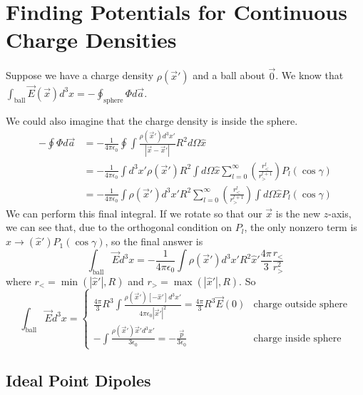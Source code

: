 \documentclass[a4paper,twoside,master.tex]{subfiles}
\begin{document}
\section{Finding Potentials for Continuous Charge Densities}%
\label{sec:finding_potentials_for_continuous_charge_densities}

Suppose we have a charge density $\rho(\vec{x}')$ and a ball about $\vec{0}$. We know that $\int_{\text{ball}}\vec{E}(\vec{x})d^3x = -\oint_{\text{sphere}}\Phi d\vec{a}$.

We could also imagine that the charge density is inside the sphere.
\begin{align}
    -\oint\Phi d\vec{a} &= -\frac{1}{4\pi\epsilon_0}\oint\int \frac{\rho(\vec{x}')d^3x'}{|\vec{x}-\vec{x}'|}R^2 d\Omega \hat{x}\\
    &= -\frac{1}{4\pi\epsilon_0}\int d^3x'\rho(\vec{x}')R^2\int d\Omega \hat{x}\sum_{l=0}^{\infty}\left(\frac{r^l_<}{r^{l+1}_>} \right)P_l(\cos\gamma)\\
    &= -\frac{1}{4\pi\epsilon_0}\int\rho(\vec{x}')d^3x' R^2 \sum_{l=0}^{\infty} \left( \frac{r^l_<}{r^{l+1}_>} \right)\int d\Omega \hat{x}P_l(\cos\gamma)
\end{align}
We can perform this final integral. If we rotate so that our $\vec{x}$ is the new $z$-axis, we can see that, due to the orthogonal condition on $P_l$, the only nonzero term is $\hat{x}\to (\hat{x}')P_1(\cos\gamma)$, so the final answer is
\begin{equation}
    \int_{\text{ball}}\vec{E} d^3x = -\frac{1}{4\pi\epsilon_0}\int\rho(\vec{x}')d^3x' R^2 \hat{x}' \frac{4\pi}{3} \frac{r_<}{r^2_>}
\end{equation}
where $r_< = \min(|\hat{x}'|,R)$ and $r_> = \max(|\hat{x}'|,R)$.
So
\begin{equation}
    \int_{\text{ball}}\vec{E}d^3x = \begin{cases}
        \frac{4\pi}{3}R^3\int \frac{\rho(\vec{x}')[-\hat{x}']d^3x'}{4\pi\epsilon_0|\vec{x}'|^2} = \frac{4\pi}{3}R^3 \vec{E}(0) & \text{charge outside sphere}\\
        -\int\frac{\rho(\vec{x}')\vec{x}'d^3x'}{3\epsilon_0} = -\frac{\vec{p}}{3\epsilon_0} & \text{charge inside sphere}
    \end{cases}
\end{equation}

\subsection{Ideal Point Dipoles}%
\label{sub:ideal_point_dipoles}
\end{document}
